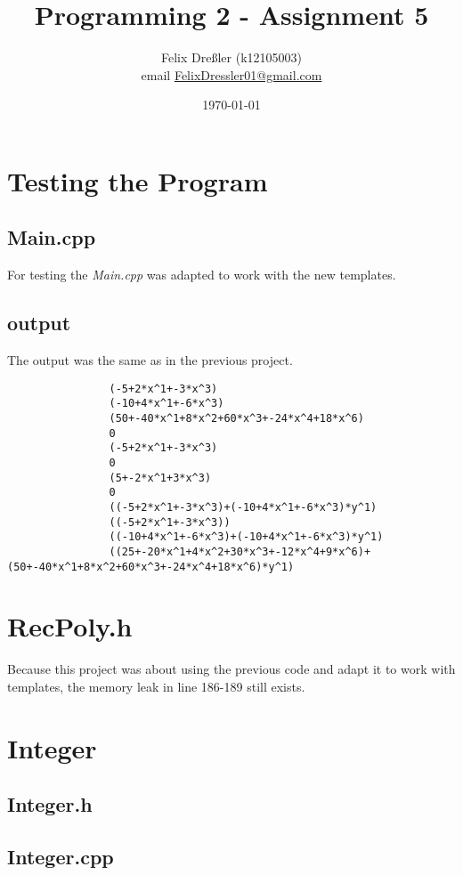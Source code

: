 \documentclass[11pt,titlepage]{article}
\title{Programming 2 - Assignment 5}
\author{Felix Dreßler (k12105003)\\ email \href{mailto:FelixDressler01@gmail.com}{FelixDressler01@gmail.com}}
\date{\today} %
\begin{document}
\maketitle
	
	\section{Testing the Program}
		\subsection{Main.cpp}
		For testing the \emph{Main.cpp} was adapted to work with the new templates.
			
		\subsection{output}
		The output was the same as in the previous project.
			\begin{lstlisting}
				(-5+2*x^1+-3*x^3)
				(-10+4*x^1+-6*x^3)
				(50+-40*x^1+8*x^2+60*x^3+-24*x^4+18*x^6)
				0
				(-5+2*x^1+-3*x^3)
				0
				(5+-2*x^1+3*x^3)
				0
				((-5+2*x^1+-3*x^3)+(-10+4*x^1+-6*x^3)*y^1)
				((-5+2*x^1+-3*x^3))
				((-10+4*x^1+-6*x^3)+(-10+4*x^1+-6*x^3)*y^1)
				((25+-20*x^1+4*x^2+30*x^3+-12*x^4+9*x^6)+(50+-40*x^1+8*x^2+60*x^3+-24*x^4+18*x^6)*y^1)
			\end{lstlisting}
	
\newpage	
	\section{RecPoly.h}
	Because this project was about using the previous code and adapt it to work with templates, the memory leak in line 186-189 still exists.
	
			
	
\newpage	
	\section{Integer}
		\subsection{Integer.h}
			
		\subsection{Integer.cpp}
			
	
			
\end{document}
